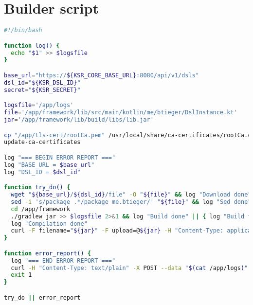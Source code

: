 \clearpage\section{Builder script}

\begin{lstlisting}[caption={Builder script},language=bash,label=appendix:builder]
#!/bin/bash

function log() {
  echo "$1" >> $logsfile
}

base_url="https://${KSR_CORE_BASE_URL}:8080/api/v1/dsls"
dsl_id="${KSR_DSL_ID}"
secret="${KSR_SECRET}"

logsfile='/app/logs'
file='/app/framework/lib/src/main/kotlin/me/btieger/DslInstance.kt'
jar='/app/framework/lib/build/libs/lib.jar'

cp "/app/tls-cert/rootCa.pem" /usr/local/share/ca-certificates/rootCa.crt
update-ca-certificates

log "=== BEGIN ERROR REPORT ==="
log "BASE_URL = $base_url"
log "DSL_ID = $dsl_id"

function try_do() {
  wget "${base_url}/${dsl_id}/file" -O "${file}" && log "Download done" || { log "Download failed" && error_report; }
  sed -i 's/package .*/package me.btieger/' "${file}" && log "Sed done" || { log "Sed failed" && error_report; }
  cd /app/framework
  ./gradlew jar >> $logsfile 2>&1 && log "Build done" || { log "Build failed" && error_report; }
  log "Compilation done"
  curl -F filename="${jar}" -F upload=@${jar} -H "Content-Type: application/java-archive" "${base_url}/${dsl_id}/jar" || { log "Upload failed" && error_report; }
}

function error_report() {
  log "=== END ERROR REPORT ==="
  curl -H "Content-Type: text/plain" -X POST --data "$(cat /app/logs)" "${base_url}/${dsl_id}/jar"
  exit 1
}

try_do || error_report
\end{lstlisting}
